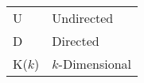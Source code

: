 \begin{tabular}{|l|l|}
    \hline
    U & Undirected \\
    D & Directed \\
    K($k$) & $k$-Dimensional \\
    \hline
\end{tabular}